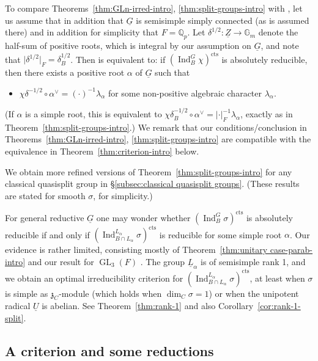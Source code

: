 \documentclass[a4paper]{amsart}
\numberwithin{equation}{section}
\theoremstyle{remark}
\theoremstyle{definition}
\DeclareMathOperator{\Ind}{Ind}
\newcommand{\Q}{\mathbb{Q}}
\DeclareMathOperator{\GL}{GL}
\newcommand{\alggrp}[1]{\underline{#1}}
\newcommand{\cts}{\mathrm{cts}}
\begin{document}
To compare Theorems~\ref{thm:GLn-irred-intro}, \ref{thm:split-groups-intro} with \cite[Conjecture 2.5]{MR2275644}, let us assume that in addition that $\alggrp G$ is semisimple simply connected
(as is assumed there) and in addition for simplicity that $F = \Q_p$.
Let $\delta^{1/2} \colon \alggrp Z \to \mathbb G_m$ denote the half-sum of positive roots, which is integral by our assumption on $\alggrp G$, and note that $\lvert \delta^{1/2}\rvert_F = \delta_B^{1/2}$.
Then \cite[Conjecture 2.5]{MR2275644} is equivalent to: 
if $(\Ind_{B}^{G}\chi)^{\cts}$ is absolutely reducible, then there exists a positive root $\alpha$ of $\alggrp G$ such that
\begin{itemize}
\item $\chi\delta^{-1/2} \circ \alpha^\vee = (\cdot)^{-1} \lambda_\alpha$ for some non-positive algebraic character $\lambda_\alpha$.
\end{itemize}
(If $\alpha$ is a simple root, this is equivalent to $\chi\delta_B^{-1/2} \circ \alpha^\vee = \lvert \cdot\rvert_F^{-1} \lambda_\alpha$, exactly as in Theorem~\ref{thm:split-groups-intro}.)
We remark that our conditions/conclusion in Theorems~\ref{thm:GLn-irred-intro}, \ref{thm:split-groups-intro} are compatible with the equivalence in Theorem~\ref{thm:criterion-intro} below.

We obtain more refined versions of Theorem~\ref{thm:split-groups-intro} for any classical quasisplit group in \S\ref{subsec:classical quasisplit groups}.
(These results are stated for smooth $\sigma$, for simplicity.)

For general reductive $\alggrp G$ one may wonder whether $(\Ind_{B}^{G}\sigma)^{\cts}$ is absolutely reducible if and only if $(\Ind_{B\cap L_\alpha}^{L_\alpha}\sigma)^{\cts}$ is reducible for some simple root $\alpha$.
Our evidence is rather limited, consisting mostly of Theorem~\ref{thm:unitary case-parab-intro} and our result for $\GL_3(F)$ \cite{gl3}.
The group $\alggrp L_\alpha$ is of semisimple rank 1, and we obtain an optimal irreducibility criterion for $(\Ind_{B\cap L_\alpha}^{L_\alpha}\sigma)^{\cts}$,
at least when $\sigma$ is simple as $\mathfrak z_C$-module (which holds when $\dim_C \sigma = 1$) or when the unipotent radical $\alggrp U$ is abelian.
See Theorem~\ref{thm:rank-1} and also Corollary~\ref{cor:rank-1-split}.


\subsection{A criterion and some reductions}
\label{sec:criterion}
\end{document}
